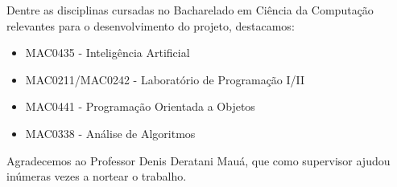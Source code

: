 Dentre as disciplinas cursadas no Bacharelado em Ciência da Computação relevantes para o desenvolvimento do projeto, destacamos:
\begin{itemize}
\item MAC0435 - Inteligência Artificial
\item MAC0211/MAC0242 - Laboratório de Programação I/II
\item MAC0441 - Programação Orientada a Objetos
\item MAC0338 - Análise de Algoritmos
\end{itemize}
Agradecemos ao Professor Denis Deratani Mauá, que como supervisor ajudou inúmeras vezes a nortear o
trabalho.
